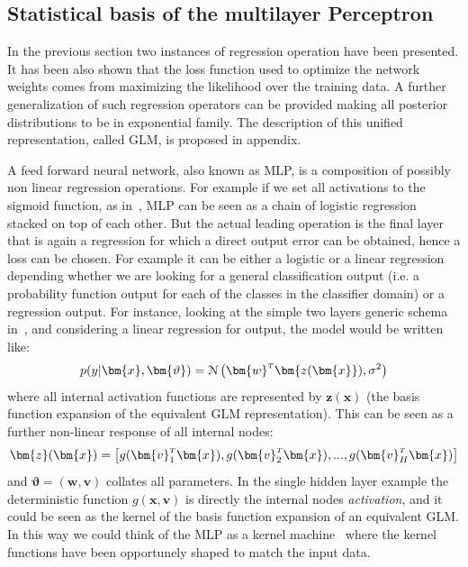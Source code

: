 \subsection{Statistical basis of the multilayer Perceptron}
\label{section:feedforward dense networks}

In the previous section two instances of regression operation have been presented. It has been also shown that the loss function used to optimize the network weights comes from maximizing the likelihood over the training data.
A further generalization of such regression operators can be provided making all posterior distributions to be in exponential family. The description of this unified representation, called \ac{GLM}, is proposed in appendix.

A feed forward neural network, also known as \ac{MLP}, is a composition of possibly non linear regression operations. For example if we set all activations to the sigmoid function, as in~\Figure{\ref{fig:mlp_b}}, \acs{MLP} can be seen as a chain of logistic regression stacked on top of each other. But the actual leading operation is the final layer that is again a regression for which a direct output error can be obtained, hence a loss can be chosen. For example it can be either a logistic or a linear regression depending whether we are looking for a general classification output (i.e. a probability function output for each of the classes in the classifier domain) or a regression output. 
For instance, looking at the simple two layers generic schema in~\Figure{\ref{fig:generic_mlp_a}}, and considering a linear regression for output, the model would be written like:
\begin{equation}
    p(y|\bm{x},\bm{\vartheta}) = \mathcal{N}\left(\transpose{\bm{w}}\bm{z(\bm{x}}), \sigma^2 \right)
    \label{eq:mlp_a}
\end{equation}
where all internal activation functions are represented by $\bm{z}(\bm{x})$ (the basis function expansion of the equivalent \acs{GLM} representation). This can be seen as a further non-linear response of all internal nodes:
\begin{equation}
    \bm{z}(\bm{x}) = \left[ g(\transpose{\bm{v}_1}\bm{x}), g(\transpose{\bm{v}_2}\bm{x}), ..., g(\transpose{\bm{v}_H}\bm{x})
    \right]
    \label{eq:mlp_b}
\end{equation}
and $\bm{\vartheta} = (\bm{w},\bm{v})$ collates all parameters.
In the single hidden layer example the deterministic function $g(\bm{x},\bm{v})$ is directly the internal nodes \textit{activation}, and it could be seen as the kernel of the basis function expansion of an equivalent \acs{GLM}. In this way we could think of the \acl{MLP} as a kernel machine~\cite{Scholkopf:1999:AKM:299094} where the kernel functions have been opportunely shaped to match the input data. 


